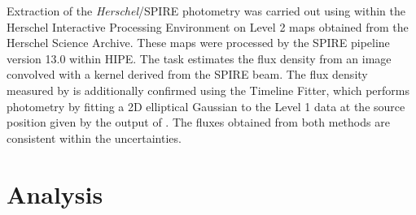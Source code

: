 \documentclass[]{emulateapj}
\begin{document}
Extraction of the {\it Herschel}/SPIRE photometry was
carried out using  within the Herschel Interactive
Processing Environment \citep[HIPE;][]{Ott10a}
on Level 2 maps obtained from the Herschel Science Archive.
These maps were processed by the SPIRE pipeline
version 13.0 within HIPE. The  task estimates
the flux density from an image convolved with a kernel
derived from the SPIRE beam. The flux density
measured by  is additionally confirmed
using the Timeline Fitter, which performs photometry
by fitting a 2D elliptical Gaussian to the Level 1 data at the
source position given by the output of . The fluxes
obtained from both methods are consistent within the uncertainties.



\section{Analysis} \label{sec:anal}
%
%
\end{document}

